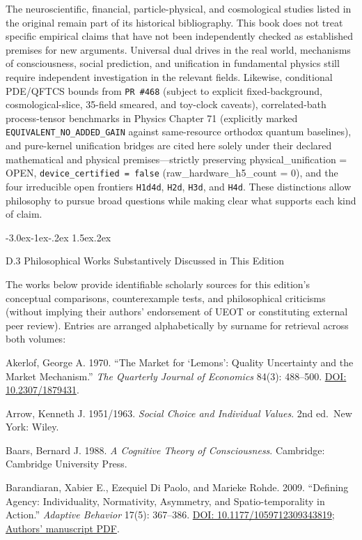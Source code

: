 \documentclass[
  english,
  11pt,
  oneside]{book}
\makeatletter
\renewcommand\section{\@startsection{section}{1}{\z@}%
  {-3.0ex\@plus-1ex\@minus-.2ex}%
  {1.5ex\@plus.2ex}%
  {\normalfont\Large\bfseries\raggedright\hyphenpenalty=10000\exhyphenpenalty=10000}}
\makeatother
\begin{document}
The neuroscientific, financial, particle-physical, and cosmological studies listed in the original remain part of its historical bibliography. This book does not treat specific empirical claims that have not been independently checked as established premises for new arguments. Universal dual drives in the real world, mechanisms of consciousness, social prediction, and unification in fundamental physics still require independent investigation in the relevant fields. Likewise, conditional PDE/QFTCS bounds from \texttt{PR\ \#468} (subject to explicit fixed-background, cosmological-slice, 35-field smeared, and toy-clock caveats), correlated-bath process-tensor benchmarks in Physics Chapter 71 (explicitly marked \texttt{EQUIVALENT\_NO\_ADDED\_GAIN} against same-resource orthodox quantum baselines), and pure-kernel unification bridges are cited here solely under their declared mathematical and physical premises---strictly preserving physical\_unification = OPEN, \texttt{device\_certified\ =\ false} (raw\_hardware\_h5\_count = 0), and the four irreducible open frontiers \texttt{H1d4d}, \texttt{H2d}, \texttt{H3d}, and \texttt{H4d}. These distinctions allow philosophy to pursue broad questions while making clear what supports each kind of claim.

\section{D.3 Philosophical Works Substantively Discussed in This Edition}\label{ph-d-3}

\begingroup\small\raggedright\setlength{\parskip}{0.25em}

The works below provide identifiable scholarly sources for this edition's conceptual comparisons, counterexample tests, and philosophical criticisms (without implying their authors' endorsement of UEOT or constituting external peer review). Entries are arranged alphabetically by surname for retrieval across both volumes:

Akerlof, George A. 1970. ``The Market for `Lemons': Quality Uncertainty and the Market Mechanism.'' \emph{The Quarterly Journal of Economics} 84(3): 488--500. \href{https://doi.org/10.2307/1879431}{DOI: 10.2307/1879431}.

Arrow, Kenneth J. 1951/1963. \emph{Social Choice and Individual Values}. 2nd ed.~New York: Wiley.

Baars, Bernard J. 1988. \emph{A Cognitive Theory of Consciousness}. Cambridge: Cambridge University Press.

Barandiaran, Xabier E., Ezequiel Di Paolo, and Marieke Rohde. 2009. ``Defining Agency: Individuality, Normativity, Asymmetry, and Spatio-temporality in Action.'' \emph{Adaptive Behavior} 17(5): 367--386. \href{https://doi.org/10.1177/1059712309343819}{DOI: 10.1177/1059712309343819}; \href{https://xabier.barandiaran.net/wp-content/uploads/2009/07/barandiaran_dipaolo_rohde_-_defining_agency_v_1_0_-_jab_20091.pdf}{Authors' manuscript PDF}.
\end{document}
